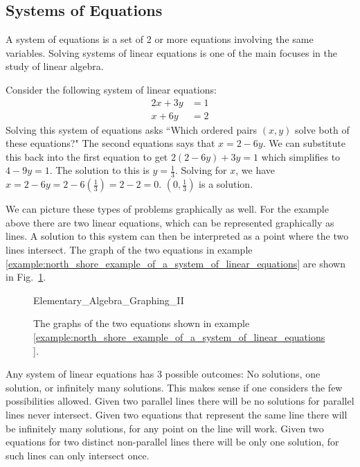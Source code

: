 \documentclass[crop=false,class=book,oneside]{standalone}
\begin{document}
    \subsection{Systems of Equations}
        A system of equations is a set of 2 or more equations involving the same variables. Solving systems of linear equations is one of the main focuses in the study of linear algebra.
        \begin{fexample}{}{}
        \label{example:north_shore_example_of_a_system_of_linear_equations}Consider the following system of linear equations:
        \begin{align*}
            2x+3y&=1\\
            x+6y&=2
        \end{align*}
        Solving this system of equations asks ``Which ordered pairs $(x,y)$ solve both of these equations?" The second equations says that $x=2-6y$. We can substitute this back into the first equation to get $2(2-6y)+3y=1$ which simplifies to $4-9y=1$. The solution to this is $y=\frac{1}{3}$. Solving for $x$, we have $x=2-6y=2-6(\frac{1}{3})=2-2=0$. $(0,\frac{1}{3})$ is a solution.
        \end{fexample}
        We can picture these types of problems graphically as well. For the example above there are two linear equations, which can be represented graphically as lines. A solution to this system can then be interpreted as a point where the two lines intersect. The graph of the two equations in example \ref{example:north_shore_example_of_a_system_of_linear_equations} are shown in Fig.~\ref{fig:north_shore_systems_of_linear_equations}.
        \begin{figure}[H]
            \centering
            \captionsetup{type=figure}
            {Elementary_Algebra_Graphing_II}
            \caption{The graphs of the two equations shown in example \ref{example:north_shore_example_of_a_system_of_linear_equations}.}
            \label{fig:north_shore_systems_of_linear_equations}
        \end{figure}
        Any system of linear equations has 3 possible outcomes: No solutions, one solution, or infinitely many solutions. This makes sense if one considers the few possibilities allowed. Given two parallel lines there will be no solutions for parallel lines never intersect. Given two equations that represent the same line there will be infinitely many solutions, for any point on the line will work. Given two equations for two distinct non-parallel lines there will be only one solution, for such lines can only intersect once.
\end{document}
